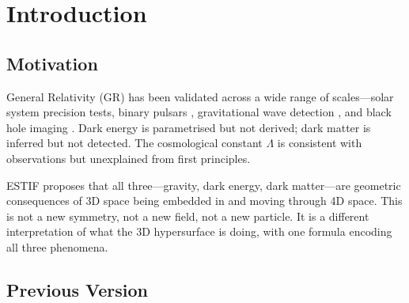 \documentclass[12pt]{article}
\begin{document}
\begin{abstract}
Additional analytical results (19/19 analytical tests pass): GR time dilation $\tau(x)$
is the special case of $\sqrt{\beta(x)}$ at $n = 1/2$ ($x = 0.272$). Gravity, time
dilation, and 4D eddy spin are identical at the crossover. $\Omega_m = x_0$ to 0.12\%,
virial condition $\sigma/v_\text{esc} = 0.5$ exact, Jeans length $\lambda = 2.57r$.

The dark energy sector $\Omega_\text{tilt}(z)$ was tested against DESI DR2 BAO data
\cite{DESI2025} and found to fail ($\chi^2/N = 10.8$, DESI DR2 $w_0 = -0.73 \pm 0.10$
vs prediction $w_\text{eff} \approx -−1.358$, 3.5$\sigma$ tension). The cosmological sector
requires revision; the gravity sector results are independent and unaffected.

N-body simulation is required for galactic halo structure (collaboration target).

Code: \url{https://github.com/tervion/estif-publication}
\end{abstract}


\section{Introduction}

\subsection{Motivation}

General Relativity (GR) has been validated across a wide range of scales---solar system
precision tests, binary pulsars \cite{Will2014}, gravitational wave detection
\cite{Abbott2016}, and black hole imaging \cite{EHT2019}. Dark energy is parametrised
but not derived; dark matter is inferred but not detected. The cosmological constant
$\Lambda$ is consistent with observations but unexplained from first principles.

ESTIF proposes that all three---gravity, dark energy, dark matter---are geometric
consequences of 3D space being embedded in and moving through 4D space. This is
not a new symmetry, not a new field, not a new particle. It is a different interpretation
of what the 3D hypersurface is doing, with one formula encoding all three phenomena.

\subsection{Previous Version}
\end{document}
